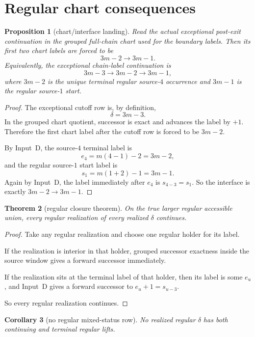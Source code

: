 \documentclass[11pt]{article}
\newtheorem{theorem}{Theorem}[section]
\newtheorem{proposition}[theorem]{Proposition}
\newtheorem{corollary}[theorem]{Corollary}
\begin{document}
\section{Regular chart consequences}

\begin{proposition}[chart/interface landing]
Read the actual exceptional post-exit continuation in the grouped full-chain
chart used for the boundary labels. Then its first two chart labels are forced
to be
\[
3m-2 \to 3m-1.
\]
Equivalently, the exceptional chain-label continuation is
\[
3m-3 \to 3m-2 \to 3m-1,
\]
where $3m-2$ is the unique terminal regular source-$4$ occurrence and $3m-1$
is the regular source-$1$ start.
\end{proposition}

\begin{proof}
The exceptional cutoff row is, by definition,
\[
\delta=3m-3.
\]
In the grouped chart quotient, successor is exact and advances the label by
$+1$. Therefore the first chart label after the cutoff row is forced to be
$3m-2$.

By Input~D, the source-$4$ terminal label is
\[
e_4=m(4-1)-2=3m-2,
\]
and the regular source-$1$ start label is
\[
s_1=m(1+2)-1=3m-1.
\]
Again by Input~D, the label immediately after $e_4$ is $s_{4-3}=s_1$. So the
interface is exactly $3m-2\to 3m-1$.
\end{proof}

\begin{theorem}[regular closure theorem]
On the true larger regular accessible union, every regular realization of every
realized $\delta$ continues.
\end{theorem}

\begin{proof}
Take any regular realization and choose one regular holder for its label.

If the realization is interior in that holder, grouped successor exactness
inside the source window gives a forward successor immediately.

If the realization sits at the terminal label of that holder, then its label is
some $e_u$, and Input~D gives a forward successor to $e_u+1=s_{u-3}$.

So every regular realization continues.
\end{proof}

\begin{corollary}[no regular mixed-status row]
No realized regular $\delta$ has both continuing and terminal regular lifts.
\end{corollary}
\end{document}
